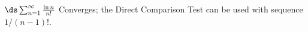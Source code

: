 {$\ds \sum_{n=1}^\infty \frac{\ln n}{n!}$
}
{Converges; the Direct Comparison Test can be used with sequence $1/(n-1)!$. 
}